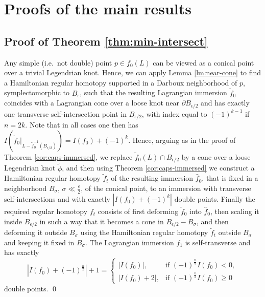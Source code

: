 \documentclass[reqno,11pt]{amsart}
\numberwithin{equation}{section}
\theoremstyle{my}
\theoremstyle{my}
\theoremstyle{your}
\newcommand{\p}{\partial }
\newcommand{\eps}{\epsilon}
\newcommand{\wt}{\widetilde}
\newcommand{\wh}{\widehat}
\begin{document}
\section{Proofs of the main results}

 \subsection{Proof of Theorem \ref{thm:min-intersect}}\label{ssec:proofmin-intersect}
Any   simple (i.e.~not double)  point $p\in f_0(L)$ can be viewed as a conical  point over a trivial Legendrian knot. Hence, we can apply
Lemma \ref{lm:near-cone} to find a Hamiltonian regular homotopy supported in a
Darboux neighborhood of $p$, symplectomorphic to $B_\eps$, such that the resulting Lagrangian immersion $\wt f_0$ coincides with a Lagrangian cone over a loose knot near $\p B_{\eps/2}$  and has  exactly one transverse self-intersection point in $B_{\eps/2}$, with index  equal to $(-1)^{k-1}$ if $n=2k$. Note that in all cases one then has $I(\wt f_0|_{L-\wt f_0^{-1}(B_{\eps/2})})=I(f_0)+(-1)^k$. Hence,  arguing as in the proof of Theorem \ref{cor:caps-immersed}, we replace $\wt f_0(L)\cap B_{\eps/2}$ by a cone over a loose Legendrian knot $\wt\phi$, and then  using Theorem \ref{cor:caps-immersed} we  construct a Hamiltonian regular homotopy $\wt f_t$ of the resulting immersion  $\wh f_0$, that is fixed in a neighborhood $B_\sigma$, $\sigma\ll\frac\eps2$, of the conical point, to an immersion with transverse self-intersections and with exactly $|I(f_0)+(-1)^{k}|$ double points. Finally 
    the required regular homotopy $f_t$ consists of first deforming $\wt f_0$ into $\wh f_0$, then scaling it inside $B_{\eps/2}$ in such a way that it becomes a cone in $B_{\eps/2}- B_\sigma$, and then deforming it outside $B_\sigma$ using the Hamiltonian regular homotopy $\wt f_t$ outside
 $B_\sigma$ and keeping it fixed in $B_\sigma$. The Lagrangian immersion $f_1$ is self-transverse and has exactly  
$$
|I(f_0)+(-1)^{\frac n2}|+1=
\begin{cases}
|I(f_0)|,&\text{if }(-1)^{\frac n2} I(f_0)<0,\\
|I(f_0)+2|,&\text{if } (-1)^{\frac n2}I(f_0)\geq0
\end{cases}
$$ 
double points.
\qed
 
\end{document}
